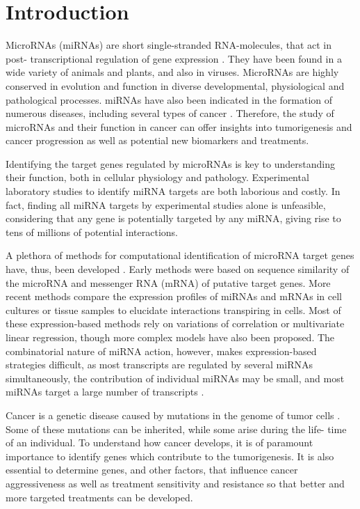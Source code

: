 
\section{Introduction}
\thispagestyle{empty}

MicroRNAs (miRNAs) are short single-stranded RNA-molecules, that act in post-
transcriptional regulation of gene expression \citep{Bartel2004}. They have
been found in a wide variety of animals and plants, and also in viruses.
MicroRNAs are highly conserved in evolution and function in diverse
developmental, physiological and pathological processes. miRNAs have also
been indicated in the formation of numerous diseases,
including several types of cancer \citep{Calin2006}. Therefore, the study of
microRNAs and their function in cancer can offer insights into tumorigenesis
and cancer progression as well as potential new biomarkers and treatments.

Identifying the target genes regulated by microRNAs is key to understanding their
function, both in cellular physiology and pathology. Experimental laboratory
studies to identify miRNA targets are both laborious and costly. In fact,
finding all miRNA targets by experimental studies alone is unfeasible, considering
that any gene is potentially targeted by any miRNA, giving rise to tens of
millions of potential interactions.

A plethora of methods for computational identification of microRNA target
genes have, thus, been developed \citep{Muniategui2013}. Early methods were based on sequence
similarity of the microRNA and messenger RNA (mRNA) of putative target genes.
More recent methods compare the expression profiles of miRNAs and mRNAs in
cell cultures or tissue samples to elucidate interactions transpiring in
cells. Most of these expression-based methods rely on variations of
correlation or multivariate linear regression, though more
complex models have also been proposed. The combinatorial nature of miRNA
action, however, makes expression-based strategies difficult, as most
transcripts are regulated by several miRNAs simultaneously, the contribution
of individual miRNAs may be small, and most miRNAs target a large number of
transcripts \citep{Baek2008}.

Cancer is a genetic disease caused by mutations in the genome of tumor cells \citep{Hanahan2000}.
Some of these mutations can be inherited, while some arise during the life-
time of an individual. To understand how cancer develops, it is of
paramount importance to identify genes which contribute to the tumorigenesis.
It is also essential to determine genes, and other factors, that influence
cancer aggressiveness as well as treatment sensitivity and resistance so that better
and more targeted treatments can be developed.

